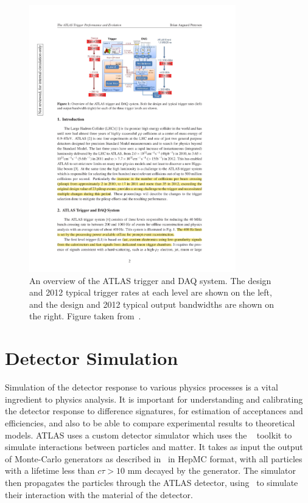 \begin{figure}[h]
\centering
\includegraphics[width=0.8\textwidth]{trigger_overview}
\caption[An overview of the ATLAS trigger and DAQ system.]{An overview of the ATLAS trigger and DAQ system. The design and 2012
typical trigger rates at each level are shown on the left, and the design and
2012 typical output bandwidths are shown on the right. Figure taken
from~\cite{Petersen:1491585}.}
\label{fig:trigger_overview}
\end{figure}

\section{Detector Simulation}

Simulation of the detector response to various physics processes is a vital
ingredient to physics analysis. It is important for understanding and
calibrating the detector response to difference signatures, for estimation of
acceptances and efficiencies, and also to be able to compare experimental
results to theoretical models. ATLAS uses a custom detector simulator which uses
the
\geant~\cite{Agostinelli2003250} toolkit to simulate interactions between
particles and matter. It takes as input the output of Monte-Carlo generators as described
in~\sec{} in HepMC format, with all particles with a lifetime less than $c \tau >
10$ mm decayed by the generator. The simulator then propagates the particles
through the ATLAS detector, using \geant\ to simulate their interaction with the
material of the detector. 


